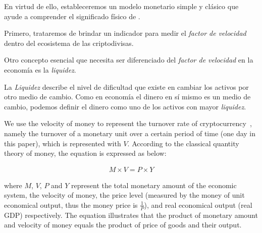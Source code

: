En virtud de ello, estableceremos un modelo monetario simple y clásico que ayude a comprender el significado físico de \nr.

Primero, trataremos de brindar un indicador para medir el \emph{factor de velocidad} dentro del ecosistema de las criptodivisas.

Otro concepto esencial que necesita ser diferenciado del \emph{factor de velocidad} en la economía es la \emph{liquidez}.

La \emph{Liquidez} describe el nivel de dificultad que existe en cambiar los activos por otro medio de cambio. Como en economía el dinero en sí mismo es un medio de cambio, podemos definir el dinero como uno de los activos con mayor \emph{liquidez}.


We use the velocity of money to represent the turnover rate of cryptocurrency~\cite{selden}, namely the turnover of a monetary unit over a certain period of time (one day in this paper), which is represented with $V$. According to the classical quantity theory of money, the equation is expressed as below:

\begin{align}
M\times V=P\times Y
\label{eq:currency}
\end{align}

\noindent where $M$, $V$, $P$ and $Y$ represent the total monetary amount of the economic system, the velocity of money, the price level (measured by the money of unit economical output, thus the money price is $\frac{1}{P}$), and real economical output (real GDP) respectively. The equation illustrates that the product of monetary amount and velocity of money equals the product of price of goods and their output.

